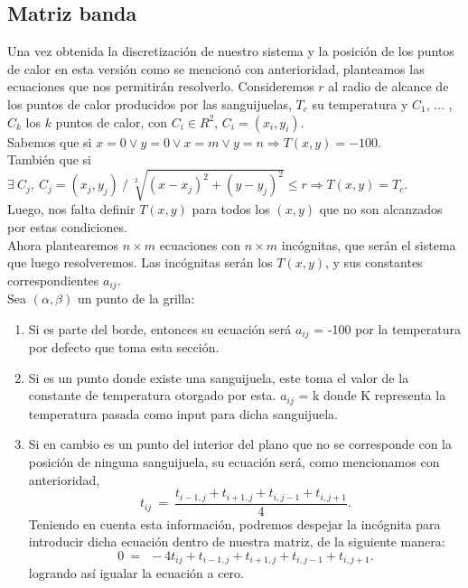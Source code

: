 \subsection{Matriz banda}

Una vez obtenida la discretizaci\'on de nuestro sistema y la posici\'on de los puntos de calor en esta versi\'on como se mencion\'o con anterioridad, planteamos las ecuaciones que nos permitir\'an resolverlo. Consideremos $r$ al radio de alcance de los puntos de calor producidos por las sanguijuelas, $T_c$ su temperatura y $C_1$, ... , $C_k$ los $k$ puntos de calor, con $C_i \in R^2$, $C_i = (x_i, y_i)$.\\

Sabemos que si $ x = 0 \vee y = 0 \vee x = m \vee y = n \Rightarrow T(x,y) = -100$. \\
Tambi\'en que si $\exists \: C_j, \: C_j = (x_j, y_j) \: / \: \sqrt[2]{(x-x_j)^2 + (y-y_j)^2} \le r \Rightarrow T(x,y) = T_c$. \\
Luego, nos falta definir $T(x,y)$ para todos los $(x,y)$ que no son alcanzados por estas condiciones.\\
Ahora plantearemos $n \times m$ ecuaciones con $n \times m$ inc\'ognitas, que ser\'an el sistema que luego resolveremos. Las inc\'ognitas ser\'an los $T(x,y)$, y sus constantes correspondientes $a_{ij}$.\\

Sea $(\alpha,\beta)$ un punto de la grilla:
\begin{enumerate}
 \item Si es parte del borde, entonces su ecuaci\'on ser\'a $a_{ij}$ = -100 por la temperatura por defecto que toma esta secci\'on.
 \item Si es un punto donde existe una sanguijuela, este toma el valor de la constante de temperatura otorgado por esta. $a_{ij}$ = k donde K representa la temperatura pasada como input para dicha sanguijuela.
 \item Si en cambio es un punto del interior del plano que no se corresponde con la posici\'on de ninguna sanguijuela, su ecuaci\'on ser\'a, como mencionamos con anterioridad, 
\begin{equation}
t_{ij} \ =\ \frac{ t_{i-1,j} + t_{i+1,j} + t_{i,j-1} + t_{i,j+1}}{4}.
\end{equation}
 Teniendo en cuenta esta informaci\'on, podremos despejar la inc\'ognita para introducir dicha ecuaci\'on dentro de nuestra matriz, de la siguiente manera:
\begin{equation}
0 \ =\ \ -4t_{ij} + t_{i-1,j} + t_{i+1,j} + t_{i,j-1} + t_{i,j+1}.
\end{equation}
logrando as\'i igualar la ecuaci\'on a cero.
\end{enumerate}

